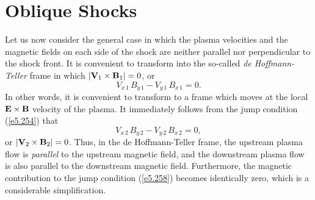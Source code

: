 \section{Oblique Shocks}
Let us now consider the general case in which the plasma velocities and
the magnetic fields on each side of the shock are neither parallel nor
perpendicular to the shock front. It is convenient to transform
into the so-called {\em de Hoffmann-Teller}\/ frame in which $|{\bf V}_1\times {\bf B}_1|=0$, or 
\begin{equation}\label{e2.285}
V_{x\,1}\,B_{y\,1} - V_{y\,1}\,B_{x\,1} = 0.
\end{equation}
In other words, it is convenient to transform to a frame which moves at the local ${\bf E}\times {\bf B}$
velocity of the plasma.
It immediately follows from the jump condition (\ref{e5.254}) that
\begin{equation}\label{e2.286}
V_{x\,2}\,B_{y\,2} - V_{y\,2}\,B_{x\,2} = 0,
\end{equation}
or $|{\bf V}_2\times {\bf B}_2|=0$. Thus,  in the de Hoffmann-Teller frame,  the upstream plasma
flow is {\em parallel}\/ to the upstream magnetic field, and the downstream plasma
flow is also parallel to the downstream magnetic field. Furthermore, the magnetic contribution to the jump
condition (\ref{e5.258}) becomes identically zero, which is a considerable simplification.

